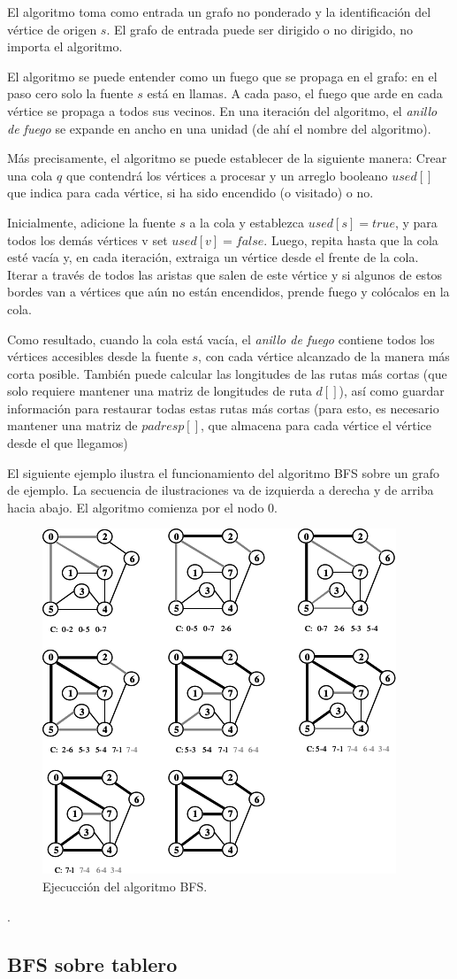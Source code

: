 El algoritmo toma como entrada un grafo no ponderado y la identificación del vértice de origen $s$. El grafo de entrada puede ser dirigido o no dirigido, no importa el algoritmo. 

El algoritmo se puede entender como un fuego que se propaga en el grafo: en el paso cero solo la fuente $s$ está en llamas. A cada paso, el fuego que arde en cada vértice se propaga a todos sus vecinos. En una iteración del algoritmo, el \emph{anillo de fuego} se expande en ancho en una unidad (de ahí el nombre del algoritmo).

Más precisamente, el algoritmo se puede establecer de la siguiente manera: Crear una cola $q$ que contendrá los vértices a procesar y un arreglo booleano $used[]$ que indica para cada vértice, si ha sido encendido (o visitado) o no. 

Inicialmente, adicione la fuente $s$ a la cola y establezca $used[s]=true$, y para todos los demás vértices v set $used[v]=false$. Luego, repita hasta que la cola esté vacía y, en cada iteración, extraiga un vértice desde el frente de la cola. Iterar a través de todos las aristas que salen de este vértice y si algunos de estos bordes van a vértices que aún no están encendidos, prende fuego y colócalos en la cola. 

Como resultado, cuando la cola está vacía, el \emph{anillo de fuego} contiene todos los vértices accesibles desde la fuente $s$, con cada vértice alcanzado de la manera más corta posible. También puede calcular las longitudes de las rutas más cortas (que solo requiere mantener una matriz de longitudes de ruta $d[]$), así como guardar información para restaurar todas estas rutas más cortas (para esto, es necesario mantener una matriz de $padres  p[]$, que almacena para cada vértice el vértice desde el que llegamos)

El siguiente ejemplo ilustra el funcionamiento del algoritmo BFS sobre un grafo de ejemplo. La secuencia de ilustraciones va de izquierda a derecha y de arriba hacia abajo. El algoritmo comienza por el nodo 0.

\begin{figure}[h]
	\centering 
	\includegraphics[scale=1.0]{img/bfs}
	\caption{Ejecucción del algoritmo BFS.}
	\label{contexto:figura1}
\end{figure}.

\subsection{BFS sobre tablero}
